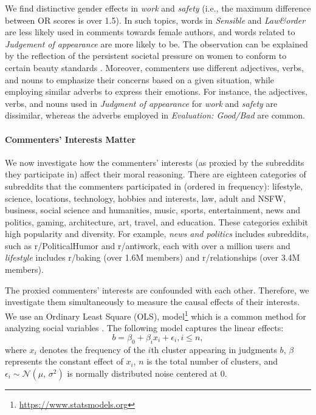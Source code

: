 \documentclass[letterpaper]{article} %
\begin{document}
We find distinctive gender effects in \textsl{work} and \textsl{safety} (i.e., the maximum difference between OR scores is over \num{1.5}).
In such topics, words in \textsl{Sensible} and \textsl{Law\&order} are less likely used in comments towards female authors, and words related to \textsl{Judgement of appearance} are more likely to be.
The observation can be explained by the reflection of the persistent societal pressure on women to conform to certain beauty standards \cite{stuart-2012-choosing}. 
Moreover, commenters use different adjectives, verbs, and nouns to emphasize their concerns based on a given situation, while employing similar adverbs to express their emotions. 
For instance, the adjectives, verbs, and nouns used in \textsl{Judgment of appearance} for \textsl{work} and \textsl{safety} are dissimilar, whereas the adverbs employed in \textsl{Evaluation: Good/Bad} are common. 

\paragraph{Commenters' Interests Matter}

We now investigate how the commenters' interests (as proxied by the subreddits they participate in) affect their moral reasoning.
There are eighteen categories of subreddits that the commenters participated in (ordered in frequency): lifestyle, science, locations, technology, hobbies and interests, law, adult and NSFW, business, social science and humanities, music, sports, entertainment, news and politics, gaming, architecture, art, travel, and education.
These categories exhibit high popularity and diversity.
For example, \textsl{news and politics} includes subreddits, such as r/PoliticalHumor and r/antiwork, each with over a million users and \textsl{lifestyle} includes r/baking (over 1.6M members) and r/relationships (over 3.4M members).

The proxied commenters' interests are confounded with each other.
Therefore, we investigate them simultaneously to measure the causal effects of their interests.
We use an Ordinary Least Square (OLS), model\footnote{\url{https://www.statsmodels.org}} which is a common method for analyzing social variables \cite{ross-1980-causal}.
The following model captures the linear effects:
\begin{equation}
    b = \beta_0 + \beta_i x_i + \epsilon_i, i \le n,
\end{equation}
where $x_i$ denotes the frequency of the $i$th cluster appearing in judgments $b$, $\beta$ represents the constant effect of $x_i$, $n$ is the total number of clusters, and $\epsilon_i \sim \mathcal{N}(\mu,\,\sigma^{2})$ is normally distributed noise centered at 0.
\end{document}
